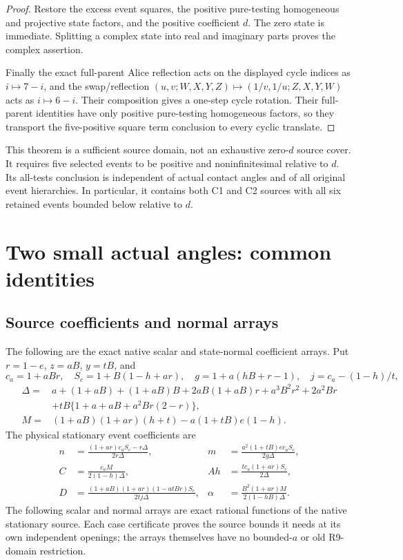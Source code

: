 \begin{proof}
Restore the excess event squares, the positive pure-testing homogeneous
and projective state factors, and the positive coefficient $d$. The
zero state is immediate. Splitting a complex state into real and
imaginary parts proves the complex assertion.

Finally the exact full-parent Alice reflection acts on the displayed
cycle indices as $i\mapsto7-i$, and the swap/reflection
$(u,v;W,X,Y,Z)\mapsto(1/v,1/u;Z,X,Y,W)$ acts as $i\mapsto6-i$.
Their composition gives a one-step cycle rotation. Their full-parent
identities have only positive pure-testing homogeneous factors, so they
transport the five-positive square term conclusion to every cyclic translate.
\end{proof}

This theorem is a sufficient source domain, not an exhaustive zero-$d$
source cover. It requires five selected events to be positive and
noninfinitesimal relative to $d$. Its all-tests conclusion is independent
of actual contact angles and of all original event hierarchies. In
particular, it contains both C1 and C2 sources with all six retained
events bounded below relative to $d$.

\section{Two small actual angles: common identities}
\subsection{Source coefficients and normal arrays}
\label{component:pd709027c7805}

The following are the exact native scalar and state-normal coefficient arrays.
Put $r=1-e$, $z=aB$, $y=tB$, and
\[
 c_a=1+aBr,\quad S_c=1+B(1-h+ar),\quad
 g=1+a(hB+r-1),\quad j=c_a-(1-h)/t,
\]
\begin{align*}
\Delta={}&a+(1+aB)+(1+aB)B+2aB(1+aB)r+a^3B^2r^2+2a^2Br\\
 &+tB\{1+a+aB+a^2Br(2-r)\},\\
M={}&(1+aB)(1+ar)(h+t)-a(1+tB)e(1-h).
\end{align*}
The physical stationary event coefficients are
\[
\begin{aligned}
n&=\frac{(1+ar)c_aS_c-r\Delta}{2r\Delta},&
m&=\frac{a^2(1+tB)e c_aS_c}{2g\Delta},\\
C&=\frac{c_aM}{2(1-h)\Delta},&
Ah&=\frac{t c_a(1+ar)S_c}{2\Delta},\\
D&=\frac{(1+aB)(1+ar)(1-atBr)S_c}{2tj\Delta},&
\alpha&=\frac{B^2(1+ar)M}{2(1-hB)\Delta}.
\end{aligned}
\]
The following scalar and normal arrays are exact rational functions of
the native stationary source. Each case certificate proves the source
bounds it needs at its own independent openings; the arrays themselves
have no bounded-$a$ or old R9-domain restriction.

